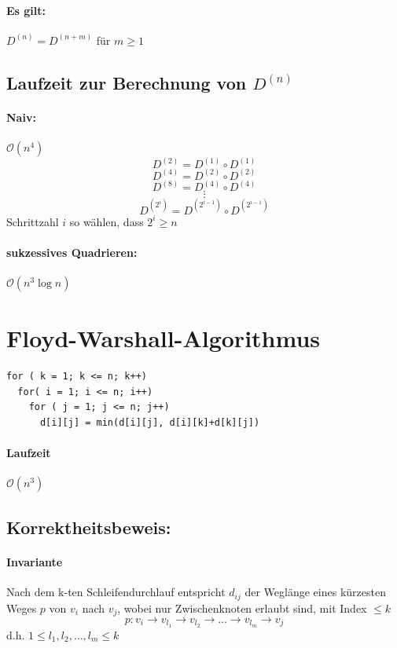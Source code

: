 \paragraph{Es gilt:} $D^{(n)} = D^{(n+m)}$ für $m\geq 1$
\subsection{Laufzeit zur Berechnung von $D^{(n)}$ }
\paragraph{Naiv:} $\mathcal{O}(n^4)$
\[ D^{(2)} = D^{(1)} \circ D^{(1)} \]
\[ D^{(4)} = D^{(2)} \circ D^{(2)} \]
\[ D^{(8)} = D^{(4)} \circ D^{(4)} \]
\[ \vdots\]
\[ D^{(2^i)} = D^{(2^{i-1})} \circ D^{(2^{i-1})} \]
Schrittzahl $i$ so wählen, dass $2^i \geq n$
\paragraph{sukzessives Quadrieren:} $\mathcal{O}(n^3\log n)$
\section{Floyd-Warshall-Algorithmus}
\begin{lstlisting}
for ( k = 1; k <= n; k++)
  for( i = 1; i <= n; i++)
    for ( j = 1; j <= n; j++)
      d[i][j] = min(d[i][j], d[i][k]+d[k][j])
\end{lstlisting}
\paragraph{Laufzeit} $\mathcal{O}(n^3)$
\subsection{Korrektheitsbeweis:}
\paragraph{Invariante} Nach dem k-ten Schleifendurchlauf entspricht $d_{ij}$ der Weglänge eines kürzesten Weges $p$ von $v_i$ nach $v_j$, 
wobei nur Zwischenknoten erlaubt sind, mit Index $\leq k$  \[p:v_i \rightarrow v_{l_1} \rightarrow v_{l_2} \rightarrow \ldots \rightarrow v_{l_m} \rightarrow v_j\]
d.h. $1\leq l_1,l_2,\ldots,l_m\leq k$
\pagebreak
